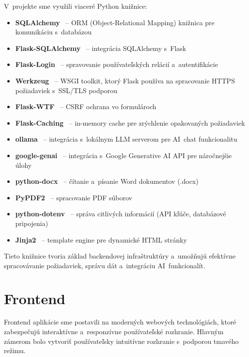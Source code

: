         V~projekte sme využili viaceré Python knižnice:

\begin{itemize}
  \item \textbf{SQLAlchemy}~\cite{sqlalchemy_docs} -- ORM (Object-Relational Mapping) knižnica pre komunikáciu s~databázou
  \item \textbf{Flask-SQLAlchemy}~\cite{sqlalchemy_docs} -- integrácia SQLAlchemy s~Flask
  \item \textbf{Flask-Login}~\cite{flask_login} -- spravovanie používateľských relácií a~autentifikácie
  \item \textbf{Werkzeug}~\cite{werkzeug_docs} -- WSGI toolkit, ktorý Flask používa na spracovanie HTTPS požiadaviek
        s~SSL/TLS podporou
  \item \textbf{Flask-WTF}~\cite{flask_wtf} -- CSRF ochrana vo formulároch
  \item \textbf{Flask-Caching}~\cite{flask_caching} -- in-memory cache pre zrýchlenie opakovaných požiadaviek
  \item \textbf{ollama}~\cite{ollama_github} -- integrácia s~lokálnym LLM serverom pre AI~chat funkcionalitu
  \item \textbf{google-genai}~\cite{google_genai} -- integrácia s~Google Generative AI API pre náročnejšie úlohy
  \item \textbf{python-docx}~\cite{python_docx} -- čítanie a~písanie Word dokumentov (.docx)
  \item \textbf{PyPDF2}~\cite{pypdf2_docs} -- spracovanie PDF súborov
  \item \textbf{python-dotenv}~\cite{python_dotenv} -- správa citlivých informácií (API kľúče, databázové pripojenia)
  \item \textbf{Jinja2}~\cite{jinja2_docs} -- template engine pre dynamické HTML stránky
\end{itemize}

        Tieto knižnice tvoria základ backendovej infraštruktúry a~umožňujú efektívne
spracovávanie požiadaviek, správu dát a~integráciu AI~funkcionalít.

\section{Frontend}

        Frontend aplikácie sme postavili na moderných webových technológiách, ktoré
zabezpečujú interaktívne a~responzívne používateľské rozhranie. Hlavným zámerom
bolo vytvoriť používateľsky intuitívne rozhranie s~podporou tmavého režimu.


